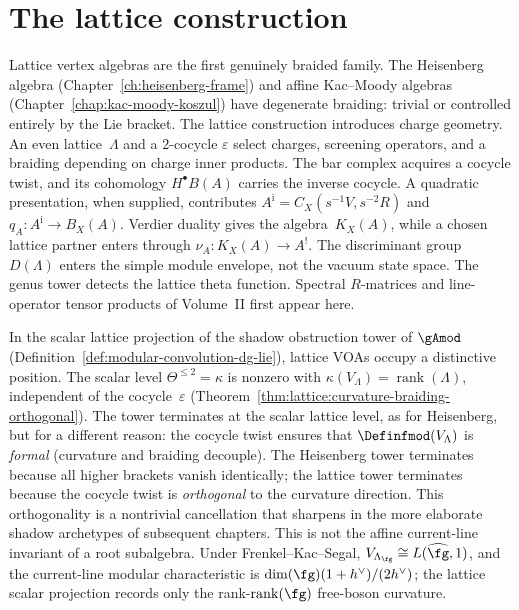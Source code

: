 
\chapter{The lattice construction}
\label{ch:lattice}

\providecommand{\PhiFA}{\Phi^{\mathrm{FA}}}
\providecommand{\SpCh}{\mathrm{Sp}^{\mathrm{ch}}}

Lattice vertex algebras are the first genuinely braided family.
The Heisenberg algebra (Chapter~\ref{ch:heisenberg-frame})
and affine Kac--Moody algebras
(Chapter~\ref{chap:kac-moody-koszul}) have degenerate braiding:
trivial or controlled entirely by the Lie bracket. The lattice
construction introduces charge geometry. An even lattice~$\Lambda$
and a $2$-cocycle $\varepsilon$ select charges, screening
operators, and a braiding depending on charge inner products.
The bar complex acquires a cocycle twist, and its cohomology
$H^\bullet B(A)$ carries the inverse cocycle.  A quadratic
presentation, when supplied, contributes
$A^{\mathrm i}=C_X(s^{-1}V,s^{-2}R)$ and
$q_A\colon A^{\mathrm i}\to B_X(A)$.  Verdier duality gives the
algebra~$K_X(A)$, while a chosen lattice partner enters through
$\nu_A\colon K_X(A)\to A^!$. The discriminant group~$D(\Lambda)$ enters the simple module
envelope, not the vacuum state space. The genus tower detects the
lattice theta function. Spectral
$R$-matrices and line-operator tensor products of
Volume~II first appear here.

In the scalar lattice projection of the shadow obstruction tower of
$\gAmod$ (Definition~\ref{def:modular-convolution-dg-lie}), lattice
VOAs occupy a distinctive position. The scalar level
$\Theta^{\leq 2} = \kappa$ is nonzero with
$\kappa(V_\Lambda) = \operatorname{rank}(\Lambda)$, independent of the
cocycle~$\varepsilon$
(Theorem~\ref{thm:lattice:curvature-braiding-orthogonal}). The
tower terminates at the scalar lattice level, as for
Heisenberg, but for a different reason: the cocycle twist ensures that
$\Definfmod(V_\Lambda)$ is \emph{formal} (curvature and braiding
decouple).
The Heisenberg tower terminates because all higher brackets vanish
identically; the lattice tower terminates because the cocycle twist is
\emph{orthogonal} to the curvature direction. This orthogonality is a
nontrivial cancellation that sharpens in the more elaborate
shadow archetypes of subsequent chapters.
This is not the affine current-line invariant of a root subalgebra.
Under Frenkel--Kac--Segal, $V_{\Lambda_\fg}\cong L(\widehat{\fg},1)$,
and the current-line modular characteristic is
$\dim(\fg)(1+h^\vee)/(2h^\vee)$; the lattice scalar projection records
only the rank-$\operatorname{rank}(\fg)$ free-boson curvature.

